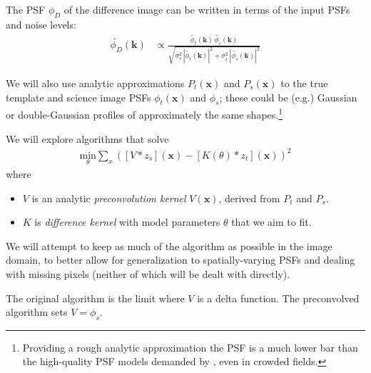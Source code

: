 \documentclass[DM,authoryear,toc]{lsstdoc}
\newcommand{\ZOGY}{\citetalias{2016ApJ...830...27Z}}
\newcommand{\AL}{\citetalias{1998ApJ...503..325A}}
\begin{document}
The PSF $\phi_D$ of the difference image can be written in terms of the input PSFs and noise levels:
\begin{align}
  \widetilde{\phi_D}(\symbf{k}) &\propto \frac{
      \widetilde{\phi_t}(\symbf{k}) \, \widetilde{\phi_s}(\symbf{k})
    }{
      \sqrt{
          \sigma_s^2 \, \left|\widetilde{\phi_t}(\symbf{k})\right|^2
          + \sigma_t^2 \, \left|\widetilde{\phi_s}(\symbf{k})\right|^2
      }
    }
  \label{eqn:zogy-psf}
\end{align}

We will also use analytic approximations $P_t(\symbf{x})$ and $P_s(\symbf{x})$ to the true template and science image PSFs $\phi_t(\symbf{x})$ and $\phi_s$; these could be (e.g.) Gaussian or double-Gaussian profiles of approximately the same shapes.\footnote{Providing a rough analytic approximation the PSF is a much lower bar than the high-quality PSF models demanded by \ZOGY{}, even in crowded fields.}

We will explore algorithms that solve
\begin{align}
  \underset{\theta}{\text{min}} \sum_x \left(
        \left[V \ast z_s\right]\!(\symbf{x}) - \left[K(\theta) \ast z_t\right]\!(\symbf{x})
      \right)^2
\end{align}
where
\begin{itemize}
  \item $V$ is an analytic \emph{preconvolution kernel} $V(\symbf{x})$, derived from $P_t$ and $P_s$.
  \item $K$ is \emph{difference kernel} with model parameters $\theta$ that we aim to fit.
\end{itemize}

We will attempt to keep as much of the algorithm as possible in the image domain, to better allow for generalization to spatially-varying PSFs and dealing with missing pixels (neither of which will be dealt with directly).

The original \AL{} algorithm is the limit where $V$ is a delta function.
The preconvolved \AL{} algorithm sets $V=\phi_s$.
\end{document}
